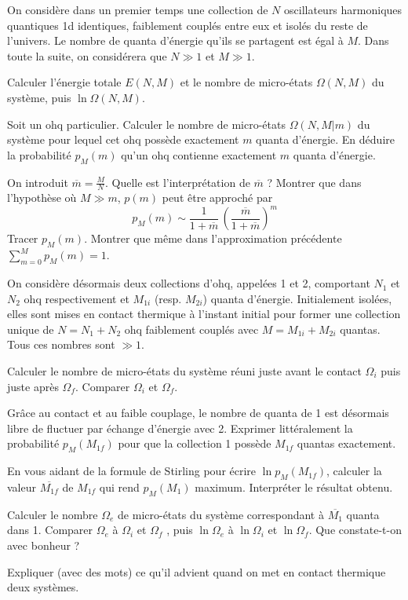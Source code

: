 On considère dans un premier temps une collection de $N $ oscillateurs harmoniques quantiques 1{\sc d} identiques, faiblement couplés entre eux et isolés du reste de l'univers. Le nombre de quanta d'énergie qu'ils se partagent est égal à $M$. Dans toute la suite, on considérera  que $N \gg 1$ et $M \gg 1$.

\question
Calculer l'énergie totale $E(N,M)$ et le nombre de micro-états $\Omega(N,M)$ du système, puis $\ln \Omega(N,M)$.

\question
Soit un {\sc ohq} particulier. Calculer le nombre de micro-états $\Omega(N,M|m)$ du système pour lequel cet {\sc ohq} possède exactement $m$ quanta d'énergie. En déduire la probabilité $p_M(m)$ qu'un {\sc ohq} contienne exactement $m$ quanta d'énergie.

\question
On introduit $\overline m= \frac{M}{N}$. Quelle est l'interprétation de $\overline m$ ? Montrer que dans l'hypothèse où $M \gg m$, $p(m)$ peut être approché par
$$
p_M(m) \sim \frac{1}{1+\overline m} \, \left(\frac{\overline m}{1+\overline m}\right)^m
$$
Tracer $p_M(m)$. Montrer que même dans l'approximation précédente $\sum_{m=0}^Mp_M(m)=1$.

\medskip
On considère désormais deux collections d'{\sc ohq}, appelées 1 et 2,  comportant $N_1$ et $N_2$ {\sc ohq} respectivement et $M_{1i}$ (resp. $M_{2i}$) quanta d'énergie. Initialement isolées, elles sont mises en contact thermique à l'instant initial pour former une collection unique de $N=N_1+N_2$ {\sc ohq} faiblement couplés avec $M=M_{1i}+M_{2i}$ quantas. Tous ces nombres sont $\gg 1$.

\question
Calculer le nombre de micro-états du système réuni juste avant le contact $\Omega_i$ puis juste après $\Omega_f$. Comparer $\Omega_i$  et $\Omega_f$.

\question
Grâce au contact et au faible couplage, le nombre de quanta de 1 est désormais libre de fluctuer par échange d'énergie avec 2. Exprimer littéralement la probabilité $p_M(M_{1f})$ pour que la collection 1 possède $M_{1f}$ quantas exactement.  

\question
En vous aidant de la formule de Stirling pour écrire $\ln p_M(M_{1f})$, calculer la valeur $\overline {M_{1f}}$ de $M_{1f}$ qui rend $p_M(M_1)$ maximum. Interpréter le résultat obtenu.

\question
Calculer le nombre $\Omega_e$ de micro-états du système correspondant à  $\overline{M_1}$ quanta dans 1. Comparer $\Omega_e$  à $\Omega_i$  et $\Omega_f$ , puis $\ln \Omega_e$  à $\ln \Omega_i$  et $\ln \Omega_f$. Que constate-t-on avec bonheur ?

\question
Expliquer (avec des mots) ce qu'il advient quand on met en contact thermique deux systèmes.
